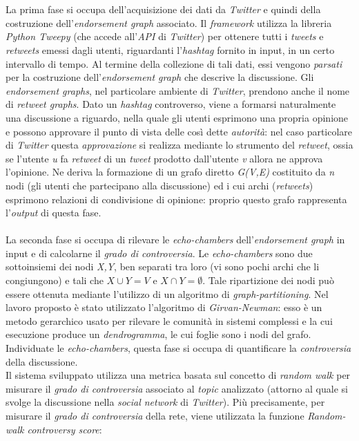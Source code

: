 \\\\La prima fase si occupa dell'acquisizione dei dati da \textit{Twitter} e quindi della costruzione dell'\textit{endorsement graph} associato. Il \textit{framework} utilizza la libreria \textit{Python Tweepy} (che accede all'\textit{API} di \textit{Twitter}) per ottenere tutti i \textit{tweets} e \textit{retweets} emessi dagli utenti, riguardanti l'\textit{hashtag} fornito in input, in un certo intervallo di tempo. Al termine della collezione di tali dati, essi vengono \textit{parsati} per la costruzione dell'\textit{endorsement graph} che descrive la discussione. Gli \textit{endorsement graphs}, nel particolare ambiente di \textit{Twitter}, prendono anche il nome di \textit{retweet graphs}. Dato un \textit{hashtag} controverso, viene a formarsi naturalmente una discussione a riguardo, nella quale gli utenti esprimono una propria opinione e possono approvare il punto di vista delle così dette \textit{autorità}: nel caso particolare di \textit{Twitter} questa \textit{approvazione} si realizza mediante lo strumento del \textit{retweet}, ossia se l'utente \textit{u} fa \textit{retweet} di un \textit{tweet} prodotto dall'utente \textit{v} allora ne approva l'opinione. Ne deriva la formazione di un grafo diretto \textit{G(V,E)} costituito da \textit{n} nodi (gli utenti che partecipano alla discussione) ed i cui archi (\textit{retweets}) esprimono relazioni di condivisione di opinione: proprio questo grafo rappresenta l'\textit{output} di questa fase.
\\\\La seconda fase si occupa di rilevare le \textit{echo-chambers} dell'\textit{endorsement graph} in input e di calcolarne il \textit{grado di controversia}. Le \textit{echo-chambers} sono due sottoinsiemi dei nodi \textit{X,Y}, ben separati tra loro (vi sono pochi archi che li congiungono) e tali che \textit{$X \cup Y = V$} e \textit{$X \cap Y =  \emptyset$}. Tale ripartizione dei nodi può essere ottenuta mediante l'utilizzo di un algoritmo di \textit{graph-partitioning}. Nel lavoro proposto è stato utilizzato l'algoritmo di \textit{Girvan-Newman}: esso è un metodo gerarchico usato per rilevare le comunità in sistemi complessi e la cui esecuzione produce un \textit{dendrogramma}, le cui foglie sono i nodi del grafo. Individuate le \textit{echo-chambers}, questa fase si occupa di quantificare la \textit{controversia} della discussione.
\\Il sistema sviluppato utilizza una metrica basata sul concetto di \textit{random walk} per misurare il \textit{grado di controversia} associato al \textit{topic} analizzato (attorno al quale si svolge la discussione nella \textit{social network} di \textit{Twitter}). Più precisamente, per misurare il \textit{grado di controversia} della rete, viene utilizzata la funzione \textit{Random-walk controversy score}:
